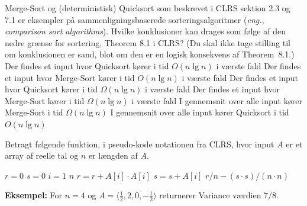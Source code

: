 



{\sc Merge-Sort} og (deterministisk) {\sc Quicksort} som beskrevet i CLRS sektion 2.3 og 7.1 er eksempler på sammenligningsbaserede sorteringsalgoritmer (\emph{eng., comparison sort algorithms}).
Hvilke konklusioner kan drages som følge af den nedre grænse for sortering, Theorem 8.1 i CLRS?
(Du skal ikke tage stilling til om konklusionen er sand, blot om den er en logisk konsekvens af Theorem~8.1.)
\fleresvar
\mulighederstart
\svar Der findes et input hvor {\sc Quicksort} kører i tid $O(n \lg n)$ i værste fald
\svar Der findes et input hvor {\sc Merge-Sort} kører i tid $O(n \lg n)$ i værste fald
\svar Der findes et input hvor {\sc Quicksort} kører i tid $\Omega(n \lg n)$ i værste fald \korrekt
\svar Der findes et input hvor {\sc Merge-Sort} kører i tid $\Omega(n \lg n)$ i værste fald \korrekt
\svar I gennemsnit over alle input kører {\sc Merge-Sort} i tid $\Omega(n \lg n)$
\svar I gennemsnit over alle input kører {\sc Quicksort} i tid $O(n \lg n)$
\mulighederslut






Betragt følgende funktion, i pseudo-kode notationen fra CLRS, hvor input $A$ er et array af reelle tal og $n$ er længden af $A$.
\begin{codebox}
  \li $r = 0$
  \li $s = 0$
  \li \For $i = 1$ \To $n$
  \li \Do $r = r + A[i] \cdot A[i]$
  \li $s = s + A[i]$ \End
  \li \Return $r / n - (s\cdot s)/(n\cdot n)$
\end{codebox}

{\bf Eksempel:} For $n=4$ og $A = \langle\frac{1}{2},2,0,-\frac{1}{2}\rangle$ returnerer {\sc Variance} værdien $7/8$.
\medskip

